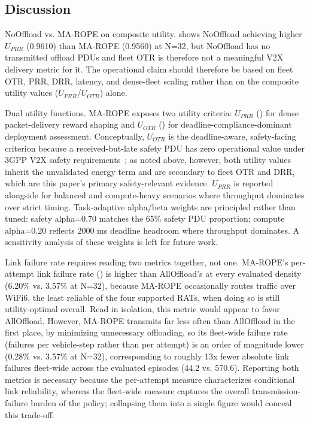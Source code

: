 \documentclass[journal,10pt,twocolumn]{IEEEtran}
\begin{document}
\subsection{Discussion}

NoOffload vs. MA-ROPE on composite utility.  shows NoOffload achieving higher $U_{PRR}$ (0.9610) than MA-ROPE (0.9560) at N=32, but NoOffload has no transmitted offload PDUs and fleet OTR is therefore not a meaningful V2X delivery metric for it. The operational claim should therefore be based on fleet OTR, PRR, DRR, latency, and dense-fleet scaling rather than on the composite utility values ($U_{PRR}$/$U_{OTR}$) alone.

Dual utility functions. MA-ROPE exposes two utility criteria: $U_{PRR}$ () for dense packet-delivery reward shaping and $U_{OTR}$ () for deadline-compliance-dominant deployment assessment. Conceptually, $U_{OTR}$ is the deadline-aware, safety-facing criterion because a received-but-late safety PDU has zero operational value under 3GPP V2X safety requirements~\cite{molina2017}; as noted above, however, both utility values inherit the unvalidated energy term and are secondary to fleet OTR and DRR, which are this paper's primary safety-relevant evidence. $U_{PRR}$ is reported alongside for balanced and compute-heavy scenarios where throughput dominates over strict timing. Task-adaptive alpha/beta weights are principled rather than tuned: safety alpha=0.70 matches the 65\% safety PDU proportion; compute alpha=0.20 reflects 2000 ms deadline headroom where throughput dominates. A sensitivity analysis of these weights is left for future work.

Link failure rate requires reading two metrics together, not one. MA-ROPE's per-attempt link failure rate () is higher than AllOffload's at every evaluated density (6.20\% vs. 3.57\% at N=32), because MA-ROPE occasionally routes traffic over WiFi6, the least reliable of the four supported RATs, when doing so is still utility-optimal overall. Read in isolation, this metric would appear to favor AllOffload. However, MA-ROPE transmits far less often than AllOffload in the first place, by minimizing unnecessary offloading, so its fleet-wide failure rate (failures per vehicle-step rather than per attempt) is an order of magnitude lower (0.28\% vs. 3.57\% at N=32), corresponding to roughly 13x fewer absolute link failures fleet-wide across the evaluated episodes (44.2 vs. 570.6). Reporting both metrics is necessary because the per-attempt measure characterizes conditional link reliability, whereas the fleet-wide measure captures the overall transmission-failure burden of the policy; collapsing them into a single figure would conceal this trade-off.
\end{document}
